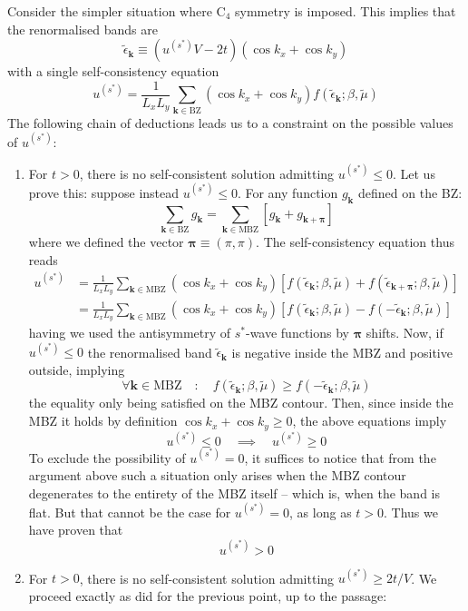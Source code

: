 Consider the simpler situation where $\mathrm{C}_4$ symmetry is imposed. This implies that the renormalised bands are
\[
\tilde{\epsilon}_\mathbf{k} \equiv (u^{(s^*)} V - 2t) (\cos k_x + \cos k_y)
\]
with a single self-consistency equation
\[
u^{(s^*)} = \frac{1}{L_x L_y} \sum_{\mathbf{k}\in\mathrm{BZ}} (\cos k_x + \cos k_y) f(\tilde{\epsilon}_\mathbf{k};\beta,\tilde{\mu})
\]
The following chain of deductions leads us to a constraint on the possible values of $u^{(s^*)}$:
\begin{enumerate}
	\item For $t>0$, there is no self-consistent solution admitting $u^{(s^*)}\le0$. Let us prove this: suppose instead $u^{(s^*)}\le0$. For any function $g_\mathbf{k}$ defined on the BZ:
	\[
	\sum_{\mathbf{k}\in\mathrm{BZ}} g_\mathbf{k} = \sum_{\mathbf{k}\in\mathrm{MBZ}} \left[
	g_\mathbf{k} + g_{\mathbf{k}+\bm{\pi}}
	\right]
	\]
	where we defined the vector $\bm{\pi}\equiv(\pi,\pi)$. The self-consistency equation thus reads
	\begin{align}
		u^{(s^*)} &= \frac{1}{L_x L_y} \sum_{\mathbf{k}\in\mathrm{MBZ}} (\cos k_x + \cos k_y) \left[
		f(\tilde{\epsilon}_\mathbf{k};\beta,\tilde{\mu}) + f(\tilde{\epsilon}_{\mathbf{k}+\bm{\pi}};\beta,\tilde{\mu})
		\right] \nonumber \\
		&= \frac{1}{L_x L_y} \sum_{\mathbf{k}\in\mathrm{MBZ}} (\cos k_x + \cos k_y) \left[
		f(\tilde{\epsilon}_\mathbf{k};\beta,\tilde{\mu}) - f(-\tilde{\epsilon}_\mathbf{k};\beta,\tilde{\mu})
		\right] \label{eq:normal-us*-constraint-int1}
	\end{align}
	having we used the antisymmetry of $s^*$-wave functions by $\bm{\pi}$ shifts. Now, if $u^{(s^*)}\le0$ the renormalised band $\tilde{\epsilon}_\mathbf{k}$ is negative inside the MBZ and positive outside, implying
	\[
	\forall \mathbf{k} \in \mathrm{MBZ}
	\quad\colon\quad
	f(\tilde{\epsilon}_\mathbf{k};\beta,\tilde{\mu}) \ge f(-\tilde{\epsilon}_\mathbf{k};\beta,\tilde{\mu})
	\]
	the equality only being satisfied on the MBZ contour. Then, since inside the MBZ it holds by definition $\cos k_x + \cos k_y \ge 0$, the above equations imply
	\[
	u^{(s^*)} \le 0 
	\quad\implies\quad
	u^{(s^*)} \ge 0
	\]
	To exclude the possibility of $u^{(s^*)}=0$, it suffices to notice that from the argument above such a situation only arises when the MBZ contour degenerates to the entirety of the MBZ itself -- which is, when the band is flat. But that cannot be the case for $u^{(s^*)} = 0$, as long as $t>0$. Thus we have proven that
	\[
	u^{(s^*)} > 0
	\]
	\item For $t>0$, there is no self-consistent solution admitting $u^{(s^*)} \ge 2t/V$. We proceed exactly as did for the previous point, up to the passage:

\end{enumerate}
